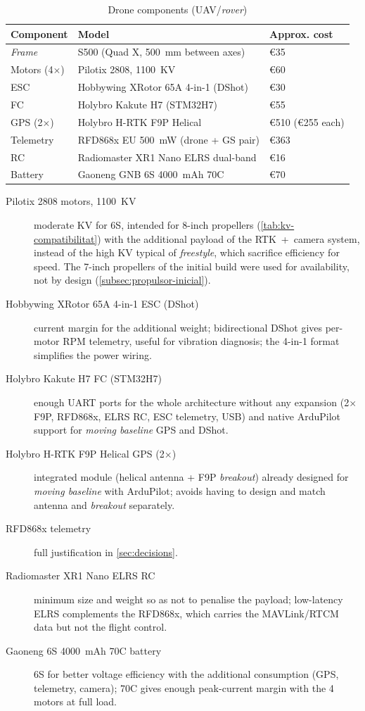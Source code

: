 \begin{table}[H]
    \centering
    \caption{Drone components (UAV/\emph{rover})}
    \label{tab:materials-dron}
    \begin{tabular}{lll}
        \toprule
        Component & Model & Approx. cost \\
        \midrule
        \emph{Frame} & S500 (Quad X, 500~mm between axes) & €35 \\
        Motors (4$\times$) & Pilotix 2808, 1100~KV & €60 \\
        ESC & Hobbywing XRotor 65A 4-in-1 (DShot) & €30 \\
        FC & Holybro Kakute H7 (STM32H7) & €55 \\
        GPS (2$\times$) & Holybro H-RTK F9P Helical & €510 (€255 each) \\
        Telemetry & RFD868x EU 500~mW (drone + GS pair) & €363 \\
        RC & Radiomaster XR1 Nano ELRS dual-band & €16 \\
        Battery & Gaoneng GNB 6S 4000~mAh 70C & €70 \\
        \bottomrule
    \end{tabular}
\end{table}

\begin{description}
    \item[Pilotix 2808 motors, 1100~KV] moderate KV for 6S, intended for 8-inch propellers (\cref{tab:kv-compatibilitat}) with the additional payload of the RTK~+~camera system, instead of the high KV typical of \emph{freestyle}, which sacrifice efficiency for speed. The 7-inch propellers of the initial build were used for availability, not by design (\cref{subsec:propulsor-inicial}).
    \item[Hobbywing XRotor 65A 4-in-1 ESC (DShot)] current margin for the additional weight; bidirectional DShot gives per-motor RPM telemetry, useful for vibration diagnosis; the 4-in-1 format simplifies the power wiring.
    \item[Holybro Kakute H7 FC (STM32H7)] enough UART ports for the whole architecture without any expansion (2$\times$F9P, RFD868x, ELRS RC, ESC telemetry, USB) and native ArduPilot support for \emph{moving baseline} GPS and DShot.
    \item[Holybro H-RTK F9P Helical GPS (2$\times$)] integrated module (helical antenna + F9P \emph{breakout}) already designed for \emph{moving baseline} with ArduPilot; avoids having to design and match antenna and \emph{breakout} separately.
    \item[RFD868x telemetry] full justification in \cref{sec:decisions}.
    \item[Radiomaster XR1 Nano ELRS RC] minimum size and weight so as not to penalise the payload; low-latency ELRS complements the RFD868x, which carries the MAVLink/RTCM data but not the flight control.
    \item[Gaoneng 6S 4000~mAh 70C battery] 6S for better voltage efficiency with the additional consumption (GPS, telemetry, camera); 70C gives enough peak-current margin with the 4 motors at full load.
\end{description}

